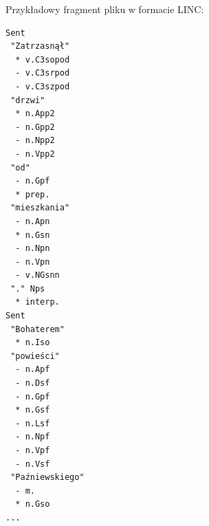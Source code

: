 \documentclass[a4paper,10]{article}
\begin{document}
Przykładowy fragment pliku w formacie LINC: 
\begin{verbatim}
Sent
 "Zatrzasnął"
  * v.C3sopod
  - v.C3srpod
  - v.C3szpod
 "drzwi"
  * n.App2
  - n.Gpp2
  - n.Npp2
  - n.Vpp2
 "od"
  - n.Gpf
  * prep.
 "mieszkania"
  - n.Apn
  * n.Gsn
  - n.Npn
  - n.Vpn
  - v.NGsnn
 "." Nps
  * interp.
Sent
 "Bohaterem"
  * n.Iso
 "powieści"
  - n.Apf
  - n.Dsf
  - n.Gpf
  * n.Gsf
  - n.Lsf
  - n.Npf
  - n.Vpf
  - n.Vsf
 "Paźniewskiego"
  - m.
  * n.Gso
...
\end{verbatim}
\end{document}
